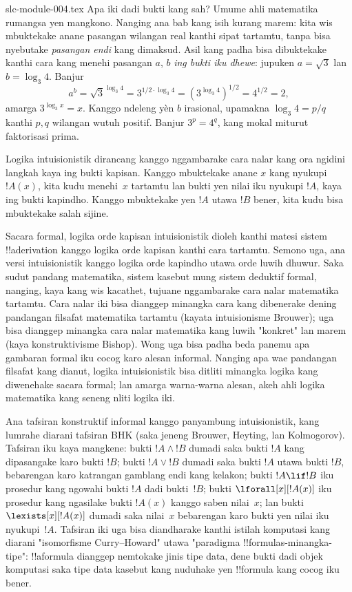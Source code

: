 \begin{filecontents*}[overwrite]{slc-module-004.tex}
Apa iki dadi bukti kang sah?
Umume ahli matematika rumangsa
yen mangkono. Nanging ana bab
kang isih kurang marem: kita
wis mbuktekake anane pasangan
wilangan real kanthi sipat
tartamtu, tanpa bisa nyebutake
\emph{pasangan endi} kang dimaksud.
Asil kang padha bisa dibuktekake
kanthi cara kang menehi pasangan
$a$, $b$ \emph{ing bukti iku dhewe}:
jupuken $a = \sqrt{3}$ lan
$b = \log_3 4$. Banjur
\[
a^b = \sqrt{3}^{\log_3 4} = 3^{1/2 \cdot \log_3 4} = (3^{\log_3
  4})^{1/2} = 4^{1/2}= 2,
\]
amarga $3^{\log_3 x} = x$. Kanggo ndeleng yèn $b$ irasional, upamakna $\log_3 4=p/q$ kanthi $p,q$ wilangan wutuh positif. Banjur $3^p=4^q$, kang mokal miturut faktorisasi prima.

Logika intuisionistik dirancang
kanggo nggambarake cara nalar
kang ora ngidini langkah kaya
ing bukti kapisan. Kanggo
mbuktekake anane $x$ kang
nyukupi~$!A(x)$, kita kudu
menehi~$x$ tartamtu lan bukti
yen nilai iku nyukupi $!A$,
kaya ing bukti kapindho.
Kanggo mbuktekake yen $!A$
utawa $!B$ bener, kita kudu
bisa mbuktekake salah sijine.

Sacara formal, logika orde kapisan
intuisionistik dioleh kanthi
matesi sistem !!a{derivation}
kanggo logika orde kapisan
kanthi cara tartamtu.
Semono uga, ana versi
intuisionistik kanggo logika
orde kapindho utawa orde
luwih dhuwur. Saka sudut
pandang matematika, sistem
kasebut mung sistem deduktif
formal, nanging, kaya kang
wis kacathet, tujuane
nggambarake cara nalar
matematika tartamtu.
Cara nalar iki bisa dianggep
minangka cara kang dibenerake
dening pandangan filsafat
matematika tartamtu (kayata
intuisionisme Brouwer);
uga bisa dianggep minangka
cara nalar matematika kang
luwih "konkret" lan marem
(kaya konstruktivisme Bishop).
Wong uga bisa padha beda
panemu apa gambaran formal
iku cocog karo alesan informal.
Nanging apa wae pandangan
filsafat kang dianut,
logika intuisionistik bisa
ditliti minangka logika
kang diwenehake sacara
formal; lan amarga warna-warna
alesan, akeh ahli logika
matematika kang seneng
nliti logika iki.

Ana tafsiran konstruktif
informal kanggo panyambung
intuisionistik, kang lumrahe
diarani tafsiran BHK
(saka jeneng Brouwer,
Heyting, lan Kolmogorov).
Tafsiran iku kaya mangkene:
bukti $!A \land !B$
dumadi saka bukti $!A$
kang dipasangake karo
bukti $!B$; bukti
$!A \lor !B$ dumadi
saka bukti $!A$ utawa
bukti $!B$, bebarengan
karo katrangan gamblang
endi kang kelakon;
bukti $!A \lif !B$
iku prosedur kang ngowahi
bukti $!A$ dadi bukti~$!B$;
bukti $\lforall[x][!A(x)]$
iku prosedur kang ngasilake
bukti $!A(x)$ kanggo
saben nilai~$x$; lan bukti
$\lexists[x][!A(x)]$
dumadi saka nilai~$x$
bebarengan karo bukti
yen nilai iku nyukupi~$!A$.
Tafsiran iki uga bisa
diandharake kanthi istilah
komputasi kang diarani
"isomorfisme Curry--Howard"
utawa "paradigma
!!{formula}s-minangka-tipe":
!!a{formula} dianggep
nemtokake jinis tipe data,
dene bukti dadi objek
komputasi saka tipe data
kasebut kang nuduhake
yen !!{formula} kang
cocog iku bener.


\end{filecontents*}
